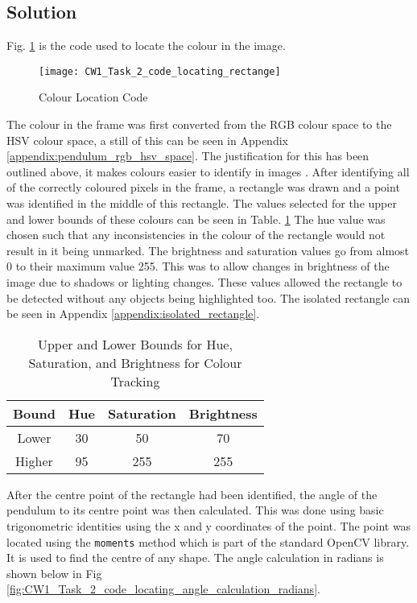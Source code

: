 \documentclass[conference]{IEEEtran}
\begin{document}
\subsection{Solution}
Fig. \ref{fig:CW1_Task_2_code_locating_rectange} is the code used to locate the colour in the image. 

\begin{figure}
\centerline{\texttt{[image: CW1\_Task\_2\_code\_locating\_rectange]}}
\caption{Colour Location Code}
\label{fig:CW1_Task_2_code_locating_rectange}
\end{figure}

The colour in the frame was first converted from the RGB colour space to the HSV colour space, a still of this can be seen in Appendix \ref{appendix:pendulum_rgb_hsv_space}. The justification for this has been outlined above, it makes colours easier to identify in images \cite{ref:HSV_vs_RGB}. After identifying all of the correctly coloured pixels in the frame, a rectangle was drawn and a point was identified in the middle of this rectangle. 
The values selected for the upper and lower bounds of these colours can be seen in Table. \ref{table:upper_and_lower_bounds} The hue value was chosen such that any inconsistencies in the colour of the rectangle would not result in it being unmarked. The brightness and saturation values go from almost 0 to their maximum value 255. This was to allow changes in brightness of the image due to shadows or lighting changes.  These values allowed the rectangle to be detected without any objects being highlighted too. The isolated rectangle can be seen in Appendix \ref{appendix:isolated_rectangle}.

\begin{table}
\begin{center}
\caption{Upper and Lower Bounds for Hue, Saturation, and Brightness for Colour Tracking}
\begin{tabular}{ || c || c | c | c || }
\hline
 Bound & Hue & Saturation & Brightness \\ 
\hline
 Lower & 30 & 50 & 70 \\  
\hline
 Higher & 95 & 255 & 255 \\    
\hline

\end{tabular}
\label{table:upper_and_lower_bounds}
\end{center}
\end{table}

After the centre point of the rectangle had been identified, the angle of the pendulum to its centre point was then calculated. This was done using basic trigonometric identities using the x and y coordinates of the point. The point was located using the \verb|moments| method which is part of the standard OpenCV library. It is used to find the centre of any shape. The angle calculation in radians is shown below in Fig \ref{fig:CW1_Task_2_code_locating_angle_calculation_radians}. 
\end{document}
